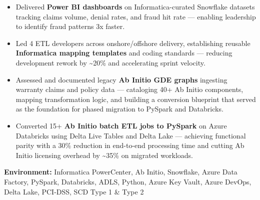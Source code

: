 \documentclass[a4paper,10pt]{article}
\begin{document}
\begin{itemize}
    \item Delivered \textbf{Power BI dashboards} on Informatica-curated Snowflake datasets tracking claims volume, denial rates, and fraud hit rate — enabling leadership to identify fraud patterns 3x faster.
    \item Led 4 ETL developers across onshore/offshore delivery, establishing reusable \textbf{Informatica mapping templates} and coding standards — reducing development rework by \textasciitilde 20\% and accelerating sprint velocity.
    \item Assessed and documented legacy \textbf{Ab Initio GDE graphs} ingesting warranty claims and policy data — cataloging 40+ Ab Initio components, mapping transformation logic, and building a conversion blueprint that served as the foundation for phased migration to PySpark and Databricks.
    \item Converted 15+ \textbf{Ab Initio batch ETL jobs to PySpark} on Azure Databricks using Delta Live Tables and Delta Lake — achieving functional parity with a 30\% reduction in end-to-end processing time and cutting Ab Initio licensing overhead by \textasciitilde 35\% on migrated workloads.
\end{itemize}

\textbf{Environment:} Informatica PowerCenter, Ab Initio, Snowflake, Azure Data Factory, PySpark, Databricks, ADLS, Python, Azure Key Vault, Azure DevOps, Delta Lake, PCI-DSS, SCD Type 1 \& Type 2
\end{document}
